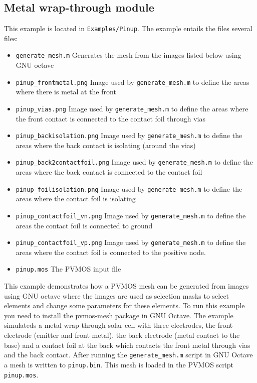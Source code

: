 \documentclass[noshowpacs,preprintnumbers,amsmath,amssymb, letter]{revtex4}
\begin{document}
\subsection{Metal wrap-through module}
This example is located in \texttt{Examples/Pinup}. The example entails the files several files:
\begin{itemize}
\item{\texttt{generate\_mesh.m}} Generates the mesh from the images listed below using GNU octave 
\item{\texttt{pinup\_frontmetal.png}} Image used by \texttt{generate\_mesh.m} to define the areas where there is metal at the front
\item{\texttt{pinup\_vias.png}} Image used by \texttt{generate\_mesh.m} to define the areas where the front contact is connected to the contact foil through vias
\item{\texttt{pinup\_backisolation.png}} Image used by \texttt{generate\_mesh.m} to define the areas where the back contact is isolating (around the vias)
\item{\texttt{pinup\_back2contactfoil.png}} Image used by \texttt{generate\_mesh.m} to define the areas where the back contact is connected to the contact foil
\item{\texttt{pinup\_foilisolation.png}} Image used by \texttt{generate\_mesh.m} to define the areas where the contact foil is isolating
\item{\texttt{pinup\_contactfoil\_vn.png}} Image used by \texttt{generate\_mesh.m} to define the areas the contact foil is connected to ground
\item{\texttt{pinup\_contactfoil\_vp.png}} Image used by \texttt{generate\_mesh.m} to define the areas where the contact foil is connected to the positive node.
\item{\texttt{pinup.mos}} The PVMOS input file
\end{itemize}
This example demonstrates how a PVMOS mesh can be generated from images using GNU octave where the images are used as selection masks to select elements and change some parameters for these elements. To run this example you need to install the pvmos-mesh package in GNU Octave. The example simulateds a metal wrap-through solar cell with three electrodes, the front electrode (emitter and front metal), the back electrode (metal contact to the base) and a contact foil at the back which contacts the front metal through vias and the back contact. After running the \texttt{generate\_mesh.m} script in GNU Octave a mesh is written to  \texttt{pinup.bin}. This mesh is loaded in the PVMOS script \texttt{pinup.mos}.
\end{document}
